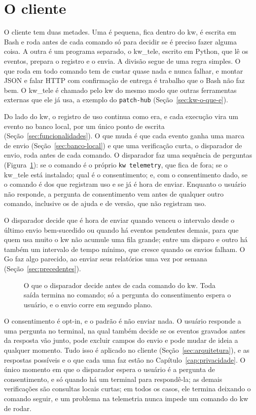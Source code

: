 \section{O cliente}
\label{sec:cliente}

O cliente tem duas metades. Uma é pequena, fica dentro do kw, é escrita em
Bash e roda antes de cada comando só para decidir se é preciso fazer alguma
coisa. A outra é um programa separado, o kw\_tele, escrito em Python, que lê
os eventos, prepara o registro e o envia. A divisão segue de uma regra
simples. O que roda em todo comando tem de custar quase nada e nunca falhar, e
montar JSON e falar HTTP com confirmação de entrega é trabalho que o Bash não
faz bem. O kw\_tele é chamado pelo kw do mesmo modo que outras ferramentas
externas que ele já usa, a exemplo do \texttt{patch-hub}
(Seção~\ref{sec:kw-o-que-e}).

Do lado do kw, o registro de uso continua como era, e cada execução vira um
evento no banco local, por um único ponto de escrita
(Seção~\ref{sec:funcionalidades}). O que muda é que cada evento ganha uma marca de envio
(Seção~\ref{sec:banco-local}) e que uma verificação curta, o disparador de
envio, roda antes de cada comando. O
disparador faz uma sequência de perguntas (Figura~\ref{fig:disparador}): se o
comando é o próprio \texttt{kw telemetry}, que fica de fora; se o kw\_tele
está instalado; qual é o consentimento; e, com o consentimento dado, se o
comando é dos que registram uso e se já é hora de enviar. Enquanto o usuário
não responde, a pergunta de consentimento vem antes de qualquer outro comando,
inclusive os de ajuda e de versão, que não registram uso.

O disparador decide que é hora de enviar quando venceu o intervalo desde o
último envio bem-sucedido ou quando há eventos pendentes
demais, para que quem usa muito o kw não acumule uma fila grande; entre um
disparo e outro há também um intervalo de tempo mínimo, que cresce quando os
envios falham. O Go faz algo parecido, ao enviar seus relatórios uma vez por semana
(Seção~\ref{sec:precedentes}).

\begin{figure}[!ht]
  \centering
  
  \caption{O que o disparador decide antes de cada comando do kw. Toda saída
    termina no comando; só a pergunta do consentimento espera o usuário, e o
    envio corre em segundo plano.}
  \label{fig:disparador}
\end{figure}

O consentimento é opt-in, e o padrão é não enviar nada. O usuário responde a
uma pergunta no terminal, na qual também decide se os eventos gravados antes
da resposta vão junto, pode excluir campos do envio e pode mudar de ideia a
qualquer momento. Tudo isso é aplicado no cliente
(Seção~\ref{sec:arquitetura}), e as respostas possíveis e o que cada uma faz
estão no Capítulo~\ref{cap:privacidade}. O único momento em que o disparador espera o usuário é a pergunta de
consentimento, e só quando há um terminal para respondê-la; as demais
verificações são consultas locais curtas; em todos os casos, ele termina deixando o comando
seguir, e um problema na telemetria nunca impede um comando do kw de rodar.

